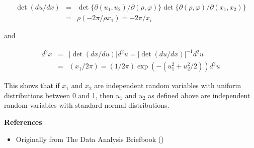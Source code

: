 \documentclass{article}
\begin{document}
\begin{eqnarray*}
\det (du/dx) & = & \det \{ \partial(u_1,u_2)/\partial(\rho,\varphi)\} \det\{\partial(\rho,\varphi) / \partial(x_1,x_2)\} \\
 & = & \rho(-2 \pi /\rho x_1) = -2 \pi / x_i
\end{eqnarray*}

and

\begin{eqnarray*}
 d^2 x & = & | \det(dx/du) | d^2u = |\det(du/dx)|^{-1} d^2 u \\
  & = & (x_1/2\pi) = (1/2 \pi) \exp(-(u_1^2+u_2^2/2))d^2 u
\end{eqnarray*}

This shows that if $x_1$ and $x_2$ are independent random variables with uniform distributions between 0 and 1, then $u_1$ and $u_2$ as defined above are independent random variables with standard normal distributions. 

{\bf References}

\begin{itemize}
\item Originally from The Data Analysis Briefbook
()
\end{itemize}
\end{document}

